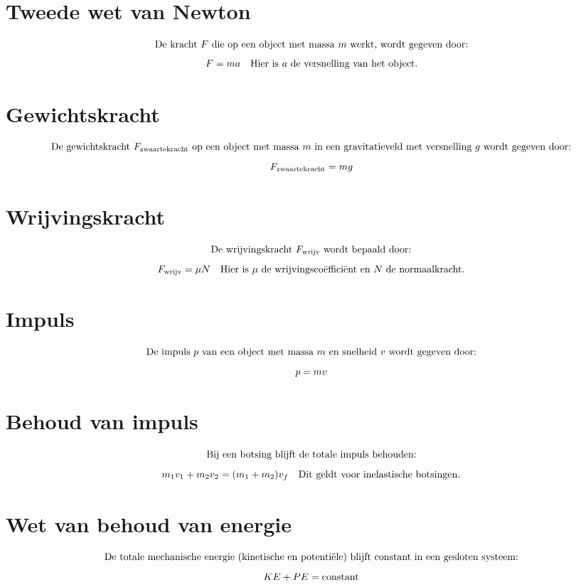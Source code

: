 \documentclass{article}
\begin{document}
\section*{Tweede wet van Newton}
\[ \text{De kracht } F \text{ die op een object met massa } m \text{ werkt, wordt gegeven door:} \\
\]
\[ F = ma \quad \text{Hier is } a \text{ de versnelling van het object.} \\
\]

\section*{Gewichtskracht}
\[ \text{De gewichtskracht } F_{\text{zwaartekracht}} \text{ op een object met massa } m \text{ in een gravitatieveld met versnelling } g \text{ wordt gegeven door:} \\
\]
\[ F_{\text{zwaartekracht}} = mg \\
\]

\section*{Wrijvingskracht}
\[ \text{De wrijvingskracht } F_{\text{wrijv}} \text{ wordt bepaald door:} \\
\]
\[ F_{\text{wrijv}} = \mu N \quad \text{Hier is } \mu \text{ de wrijvingscoëfficiënt en } N \text{ de normaalkracht.} \\
\]

\section*{Impuls}
\[ \text{De impuls } p \text{ van een object met massa } m \text{ en snelheid } v \text{ wordt gegeven door:} \\
\]
\[ p = mv \\
\]

\section*{Behoud van impuls}
\[ \text{Bij een botsing blijft de totale impuls behouden:} \\
\]
\[ m_1 v_1 + m_2 v_2 = (m_1 + m_2) v_f \quad \text{Dit geldt voor inelastische botsingen.} \\
\]

\section*{Wet van behoud van energie}
\[ \text{De totale mechanische energie (kinetische en potentiële) blijft constant in een gesloten systeem:} \\
\]
\[ KE + PE = \text{constant} \\
\]
\end{document}
